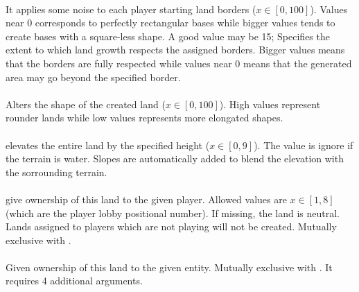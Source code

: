     \paragraph{}

    \paragraph{}
    It applies some noise to each player starting land borders ($x \in [0, 100]$). Values near 0 corresponds to perfectly rectangular bases while bigger values tends to create bases with a square-less shape. A good value may be 15;  Specifies the extent to which land growth respects the assigned borders. Bigger values means that the borders are fully respected while values near 0 means that the generated area may go beyond the specified border.

    \paragraph{}
    Alters the shape of the created land ($x \in [0, 100]$). High values represent rounder lands while low values represents more elongated shapes\cite{zetnus:2019,userpatch15}.

    \paragraph{}
    elevates the entire land by the specified height ($x \in [0, 9]$). The value is ignore if the terrain is water. Slopes are automatically added to blend the elevation with the sorrounding terrain.

    \paragraph{}
    give ownership of this land to the given player. Allowed values are $x \in [1,8]$ (which are the player lobby positional number). If missing, the land is neutral. Lands assigned to players which are not playing will not be created. Mutually exclusive with .

    \paragraph{}
    Given ownership of this land to the given entity. Mutually exclusive with . It requires 4 additional arguments.

